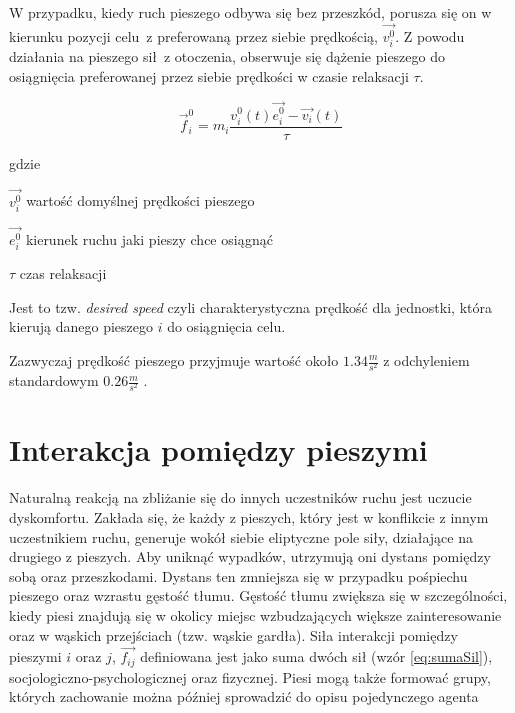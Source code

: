 W przypadku, kiedy ruch pieszego odbywa się bez przeszkód, porusza się on w kierunku pozycji celu~z preferowaną przez siebie prędkością, $\vec{v_{i}^{0}}$. Z powodu działania na pieszego sił~z otoczenia, obserwuje się dążenie pieszego do osiągnięcia preferowanej przez siebie prędkości w czasie relaksacji $\tau$.

\begin{equation}
\vec{f}_{i}^{0} = m_{i} \frac{v_{i}^{0}(t) \vec{e_{i}^{0}} - \vec{v_{i}}(t)}{\tau}
\end{equation}

gdzie
\begin{eqwhere}[2cm]
	\item[$\vec{v_{i}^{0}}$] wartość domyślnej prędkości pieszego
	\item[$\vec{e_{i}^{0}}$] kierunek ruchu jaki pieszy chce osiągnąć
	\item[$\tau$] czas relaksacji
\end{eqwhere}
	
Jest to tzw. \textit{desired speed} czyli charakterystyczna prędkość dla jednostki, która kierują danego pieszego $i$ do osiągnięcia celu.

Zazwyczaj prędkość pieszego przyjmuje wartość około $1.34 \frac{m}{s^{2}}$ z odchyleniem standardowym $0.26 \frac{m}{s^{2}}$ \cite{HeBuAjTw}.

\section{Interakcja pomiędzy pieszymi}
\label{sec:interactionBetweenPedestrians}

Naturalną reakcją na zbliżanie się do innych uczestników ruchu jest uczucie dyskomfortu. Zakłada się, że każdy z pieszych, który jest w konflikcie z innym uczestnikiem ruchu, generuje wokół siebie eliptyczne pole siły, działające na drugiego z pieszych. Aby uniknąć wypadków, utrzymują oni dystans pomiędzy sobą oraz przeszkodami. Dystans ten zmniejsza się w przypadku pośpiechu pieszego oraz wzrastu gęstość tłumu. Gęstość tłumu zwiększa się w szczególności, kiedy piesi znajdują się w okolicy miejsc wzbudzających większe zainteresowanie oraz w wąskich przejściach (tzw. wąskie gardła). Siła interakcji pomiędzy pieszymi $i$ oraz $j$, $\vec{f_{ij}}$ definiowana jest jako suma dwóch sił (wzór \ref{eq:sumaSil}), socjologiczno-psychologicznej oraz fizycznej. Piesi mogą także formować grupy, których zachowanie można później sprowadzić do opisu pojedynczego agenta \cite{HeBuAjTw}

